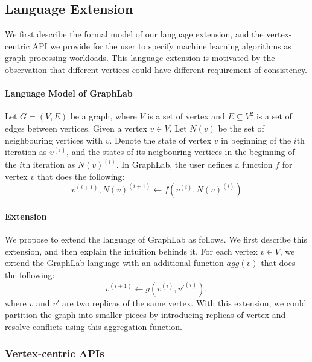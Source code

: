 \documentclass[11pt]{article}
\begin{document}
\subsection{Language Extension}

We first describe the formal model of our language extension,
and the vertex-centric API we provide for the user to specify
machine learning algorithms as graph-processing workloads.
This language extension is motivated by the observation that
different vertices could have different requirement of consistency.

\paragraph{Language Model of GraphLab} Let $G=(V,E)$ be a graph, where 
$V$ is a set of vertex and
$E\subseteq V^2$ is a set of edges between vertices. Given a vertex $v \in V$,
Let $N(v)$ be the set of neighbouring vertices with $v$. Denote the state of 
vertex $v$ in beginning of the $i$th iteration as $v^{(i)}$, and the states of 
its neigbouring vertices in the beginning of the $i$th iteration as $N(v)^{(i)}$.
In GraphLab, the user defines a function $f$ for vertex $v$ that does the 
following:
\[
 v^{(i+1)}, N(v)^{(i+1)} \leftarrow f(v^{(i)}, N(v)^{(i)})
\]

\paragraph{Extension} We propose to extend the language of GraphLab as follows. 
We first describe this extension,
and then explain the intuition behinds it.
For each vertex $v\in V$, we extend the GraphLab language with an additional 
function $agg(v)$ that does the
following: 
\[
v^{(i+1)}\leftarrow g(v^{(i)}, v'^{(i)}),
\]
where $v$ and $v'$ are 
two replicas of the same vertex. With this extension, we
could partition the graph into smaller pieces
by introducing replicas of vertex and resolve conflicts
using this aggregation function.

\subsubsection{Vertex-centric APIs}
\end{document}
